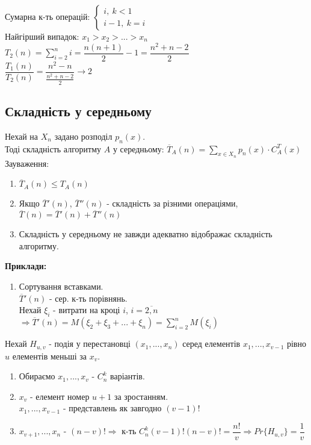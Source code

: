 \documentclass[a4paper,12pt]{article}
\newcommand{\dsum}{\displaystyle\sum}
\begin{document}
    Сумарна к-ть операцій: $
        \begin{cases}
            i,\: k<1 \\
            i-1,\: k=i
        \end{cases}$ \\
    Найгірший випадок: $x_1>x_2>...>x_n$ \\
    $T_2(n)=\dsum\limits_{i=2}^{n}i=\dfrac{n(n+1)}{2}-1=\dfrac{n^2+n-2}{2}$ \\
    $\dfrac{T_1(n)}{T_2(n)}=\dfrac{n^2-n}{\frac{n^2+n-2}{2}}\rightarrow 2$
 
\newpage
    \subsection{Складність у середньому} 
    Нехай на $X_n$ задано розподіл $p_n(x)$. \\ Тоді складність алгоритму $A$ у середньому: 
    $\overline{T}_A(n)=\dsum\limits_{x\in X_n}p_n(x)\cdot C_A^T(x)$ \\
    Зауваження:
    \begin{enumerate}
        \item $\overline{T}_A(n)\leqslant T_A(n)$
        \item Якщо $\overline{T}'(n)$, $\overline{T}''(n)$ - складність за різними операціями,
        $\overline{T}(n)=\overline{T}'(n)+\overline{T}''(n)$
        \item Складність у середньому не завжди адекватно відображає складність алгоритму.
    \end{enumerate}
    \textbf{Приклади:}
    \begin{enumerate}
        \item Сортування вставками. \\
        $\overline{T}'(n)$ - сер. к-ть порівнянь. \\
        Нехай $\xi_i$ - витрати на кроці $i$, $i=\overline{2,n}$
        $\Rightarrow \overline{T}'(n)=M(\xi_2+\xi_3+...+\xi_n)=\dsum\limits_{i=2}^{n}M(\xi_i)$ \\
    \end{enumerate}
    Нехай $H_{u,v}$ - подія у перестановці $(x_1,...,x_n)$ серед елементів $x_1,...,x_{v-1}$
    рівно $u$ елементів меньші за $x_v$.
    \begin{enumerate}
        \item Обираємо $x_1,...,x_v$ - $C_n^k$ варіантів.
        \item $x_v$ - елемент номер $u+1$ за зростанням. \\
        $x_1,...,x_{v-1}$ - представлень як завгодно $(v-1)!$
        \item $x_{v+1},...,x_n$ - $(n-v)! \Rightarrow$ к-ть $C_n^k(v-1)!(n-v)!=\dfrac{n!}{v}\Rightarrow Pr\{H_{u,v}\}=\dfrac{1}{v}$
    \end{enumerate}
\end{document}
